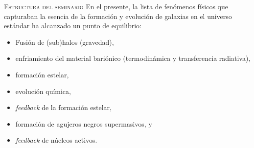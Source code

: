 \documentclass[xcolor=dvipsnames,4pt,hyperref={colorlinks,citecolor=black,linkcolor=black,urlcolor=black}]{beamer}
\begin{document}
\begin{frame}{\textsc{Estructura del seminario}}
En el presente, la lista de fenómenos físicos que capturaban la esencia de la formación y evolución
de galaxias en el universo estándar ha alcanzado un punto de equilibrio:
\begin{itemize}
\item Fusión de (sub)halos (gravedad),
\item enfriamiento del material bariónico (termodinámica y transferencia radiativa),
\item formación estelar,
\item evolución química,
\item \emph{feedback} de la formación estelar,
\item formación de agujeros negros supermasivos, y
\item \emph{feedback} de núcleos activos.
\end{itemize}
\end{frame}
\end{document}
